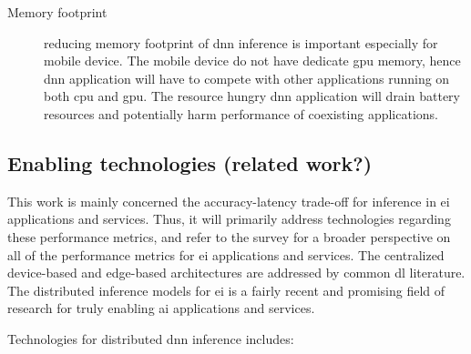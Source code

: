 \begin{description}
	\item[Memory footprint] reducing memory footprint of \gls{dnn} inference is important especially for mobile device. The mobile device do not have dedicate \gls{gpu} memory, hence \gls{dnn} application will have to compete with other applications running on both \gls{cpu} and \gls{gpu}. The resource hungry \gls{dnn} application will drain battery resources and potentially harm performance of coexisting applications.   
\end{description}

\subsection{Enabling technologies (related work?)}

This work is mainly concerned the accuracy-latency trade-off for inference in \gls{ei} applications and services. Thus, it will primarily address technologies regarding these performance metrics, and refer to the survey for a broader perspective on all of the performance metrics for \gls{ei} applications and services. The centralized device-based and edge-based architectures are addressed by common \gls{dl} literature. The distributed inference models for \gls{ei} is a fairly recent and promising field of research for truly enabling \gls{ai} applications and services.

Technologies for distributed \gls{dnn} inference includes:

